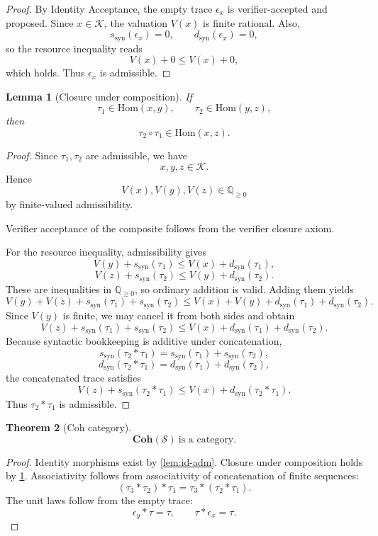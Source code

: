\documentclass[11pt]{article}
\newtheorem{theorem}{Theorem}[section]
\newtheorem{lemma}[theorem]{Lemma}
\newcommand{\Coh}{\mathbf{Coh}}
\newcommand{\Hom}{\mathrm{Hom}}
\newcommand{\syn}{\mathrm{syn}}
\newcommand{\Kadm}{\mathcal{K}}
\begin{document}
\begin{proof}
By Identity Acceptance, the empty trace $\epsilon_x$ is verifier-accepted and proposed. Since $x\in\Kadm$, the valuation $V(x)$ is finite rational. Also,
\[
s_{\syn}(\epsilon_x)=0,\qquad d_{\syn}(\epsilon_x)=0,
\]
so the resource inequality reads
\[
V(x)+0\le V(x)+0,
\]
which holds. Thus $\epsilon_x$ is admissible.
\end{proof}

\begin{lemma}[Closure under composition]\label{lem:comp-adm}
If
\[
\tau_1\in\Hom(x,y),\qquad \tau_2\in\Hom(y,z),
\]
then
\[
\tau_2\circ \tau_1 \in \Hom(x,z).
\]
\end{lemma}

\begin{proof}
Since $\tau_1,\tau_2$ are admissible, we have
\[
x,y,z\in\Kadm.
\]
Hence
\[
V(x),V(y),V(z)\in \mathbb Q_{\ge 0}
\]
by finite-valued admissibility.

Verifier acceptance of the composite follows from the verifier closure axiom.

For the resource inequality, admissibility gives
\[
V(y)+s_{\syn}(\tau_1)\le V(x)+d_{\syn}(\tau_1),
\]
\[
V(z)+s_{\syn}(\tau_2)\le V(y)+d_{\syn}(\tau_2).
\]
These are inequalities in $\mathbb Q_{\ge 0}$, so ordinary addition is valid. Adding them yields
\[
V(y)+V(z)+s_{\syn}(\tau_1)+s_{\syn}(\tau_2)
\le
V(x)+V(y)+d_{\syn}(\tau_1)+d_{\syn}(\tau_2).
\]
Since $V(y)$ is finite, we may cancel it from both sides and obtain
\[
V(z)+s_{\syn}(\tau_1)+s_{\syn}(\tau_2)
\le
V(x)+d_{\syn}(\tau_1)+d_{\syn}(\tau_2).
\]
Because syntactic bookkeeping is additive under concatenation,
\[
s_{\syn}(\tau_2 * \tau_1)=s_{\syn}(\tau_1)+s_{\syn}(\tau_2),
\]
\[
d_{\syn}(\tau_2 * \tau_1)=d_{\syn}(\tau_1)+d_{\syn}(\tau_2),
\]
the concatenated trace satisfies
\[
V(z)+s_{\syn}(\tau_2 * \tau_1)\le V(x)+d_{\syn}(\tau_2 * \tau_1).
\]
Thus $\tau_2 * \tau_1$ is admissible.
\end{proof}

\begin{theorem}[Coh category]
\[
\Coh(\mathcal S)\ \text{is a category.}
\]
\end{theorem}

\begin{proof}
Identity morphisms exist by \cref{lem:id-adm}. Closure under composition holds by \cref{lem:comp-adm}. Associativity follows from associativity of concatenation of finite sequences:
\[
(\tau_3 * \tau_2) * \tau_1 = \tau_3 * (\tau_2 * \tau_1).
\]
The unit laws follow from the empty trace:
\[
\epsilon_y * \tau = \tau,\qquad \tau * \epsilon_x = \tau.
\]
\end{proof}
\end{document}
